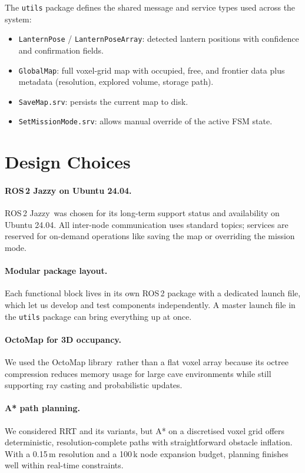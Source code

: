 \documentclass[twocolumn]{article}
\begin{document}
The \texttt{utils} package defines the shared message and service types used across the system:
\begin{itemize}
  \item \texttt{LanternPose} / \texttt{LanternPoseArray}: detected lantern positions with confidence and confirmation fields.
  \item \texttt{GlobalMap}: full voxel-grid map with occupied, free, and frontier data plus metadata (resolution, explored volume, storage path).
  \item \texttt{SaveMap.srv}: persists the current map to disk.
  \item \texttt{SetMissionMode.srv}: allows manual override of the active FSM state.
\end{itemize}


\section{Design Choices}

\paragraph{ROS\,2 Jazzy on Ubuntu 24.04.}
ROS\,2 Jazzy\,\cite{Macenski2022} was chosen for its long-term support status and availability on Ubuntu 24.04.
All inter-node communication uses standard topics; services are reserved for on-demand operations like saving the map or overriding the mission mode.

\paragraph{Modular package layout.}
Each functional block lives in its own ROS\,2 package with a dedicated launch file, which let us develop and test components independently.
A master launch file in the \texttt{utils} package can bring everything up at once.

\paragraph{OctoMap for 3D occupancy.}
We used the OctoMap library\,\cite{Hornung2013,OctomapROS} rather than a flat voxel array because its octree compression reduces memory usage for large cave environments while still supporting ray casting and probabilistic updates.

\paragraph{A* path planning.}
We considered RRT and its variants, but A* on a discretised voxel grid offers deterministic, resolution-complete paths with straightforward obstacle inflation.
With a 0.15\,m resolution and a 100\,k node expansion budget, planning finishes well within real-time constraints.
\end{document}
